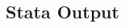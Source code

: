 \documentclass[a4paper,11pt]{scrartcl}
\begin{document}
\begin{changemargin}{0cm}{0cm}
\subsection{Stata Output}
\label{app:logfile}
\begin{figure}[h!] 
\end{figure}
\newpage


\end{changemargin}
\end{document}
